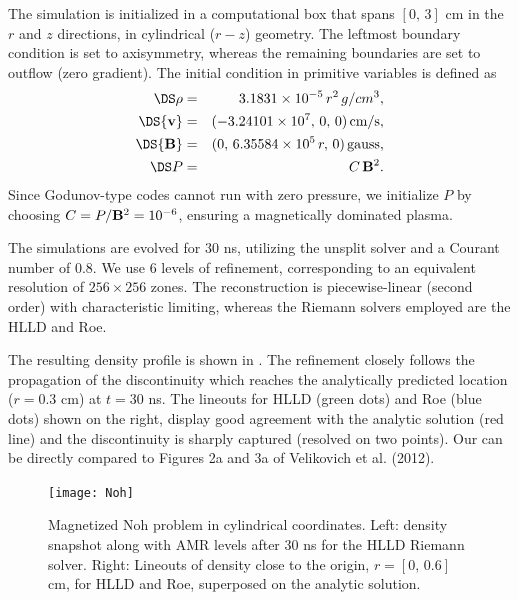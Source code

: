 The simulation is initialized in a computational box that spans $[0,\,3]$ cm in the
$r$ and $z$ directions, in cylindrical ($r-z$) geometry. The leftmost boundary condition
is set to axisymmetry, whereas the remaining boundaries are set to outflow (zero gradient).
The initial condition in primitive variables is defined as
\begin{eqnarray}
\DS \rho &=& 3.1831\times10^{-5}\,r^2\,g/cm^3,\nonumber\\
\DS {\bf v} &=& (-3.24101\times10^7,\,0,\,0)\,\textrm{cm/s},\nonumber\\
\DS {\bf B} &=& (0,\,6.35584\times10^5\,r,\,0)\,\textrm{gauss},\nonumber\\
\DS P &=& C\,{\bf B}^2.
\label{Noh_init}
\end{eqnarray}
%
Since Godunov-type codes cannot run with zero pressure, we initialize
$P$ by choosing $C=P/{\bf B}^2=10^{-6}$, ensuring a magnetically
dominated plasma. 

The simulations are evolved for $30$ ns, utilizing the unsplit solver
and a Courant number of 0.8. We use 6 levels
of refinement, corresponding to an equivalent resolution of $256\times256$ zones. The
reconstruction is piecewise-linear (second order) with characteristic limiting,
whereas the Riemann solvers employed are the HLLD and Roe. 

The resulting density profile is shown in . The refinement
closely follows the propagation of the discontinuity which reaches 
the analytically predicted location ($r=0.3$ cm) at $t=30$ ns. The lineouts for HLLD (green dots)
and Roe (blue dots) shown on the right, display good agreement with the analytic solution
(red line) and the discontinuity is sharply captured (resolved on two points).
Our  can be directly compared to Figures 2a and 3a of Velikovich et al. (2012).
%
\begin{figure}[!ht]
\begin{center}
\leavevmode\texttt{[image: Noh]}
\end{center}
\caption{\label{Fig:cylnoh} Magnetized Noh problem in cylindrical coordinates. Left: density snapshot
  along with AMR levels after 30 ns for the HLLD Riemann solver. Right: Lineouts of
  density close to the origin, $r=[0,\,0.6]$ cm, for HLLD and Roe, superposed on the
  analytic solution.}
\end{figure}




